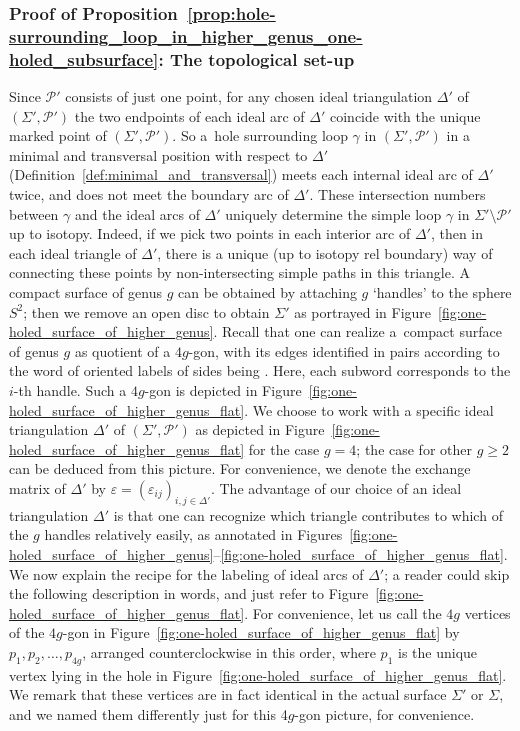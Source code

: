 \documentclass[10pt,a4paper]{amsart}
\numberwithin{equation}{section}
\theoremstyle{definition}
\begin{document}
\subsubsection{Proof of Proposition~\ref{prop:hole-surrounding_loop_in_higher_genus_one-holed_subsurface}: The topological set-up}
Since $\mathcal{P}'$ consists of just one point, for any chosen ideal triangulation $\Delta'$ of $(\Sigma',\mathcal{P}')$ the two endpoints of each ideal arc of $\Delta'$ coincide with the unique marked point of $(\Sigma',\mathcal{P}')$. So a~hole surrounding loop $\gamma$ in $(\Sigma',\mathcal{P}')$ in a minimal and transversal position with respect to $\Delta'$ (Definition~\ref{def:minimal_and_transversal}) meets each internal ideal arc of $\Delta'$ twice, and does not meet the boundary arc of $\Delta'$. These intersection numbers between $\gamma$ and the ideal arcs of $\Delta'$ uniquely determine the simple loop $\gamma$ in $\Sigma'\setminus\mathcal{P}'$ up to isotopy. Indeed, if we pick two points in each interior arc of $\Delta'$, then in each ideal triangle of $\Delta'$, there is a unique (up to isotopy rel boundary) way of connecting these points by non-intersecting simple paths in this triangle.
A compact surface of genus $g$ can be obtained by attaching $g$ `handles' to the sphere $S^2$; then we remove an open disc to obtain $\Sigma'$ as portrayed in Figure~\ref{fig:one-holed_surface_of_higher_genus}. Recall that one can realize a~compact surface of genus $g$ as quotient of a $4g$-gon, with its edges identified in pairs according to the word of oriented labels of sides being . Here, each subword  corresponds to the $i$-th handle. Such a $4g$-gon is depicted in Figure~\ref{fig:one-holed_surface_of_higher_genus_flat}.
We choose to work with a specific ideal triangulation $\Delta'$ of $(\Sigma',\mathcal{P}')$ as depicted in Figure~\ref{fig:one-holed_surface_of_higher_genus_flat} for the case $g=4$; the case for other $g\ge 2$ can be deduced from this picture. For convenience, we denote the exchange matrix of $\Delta'$ by $\varepsilon = (\varepsilon_{ij})_{i,j\in \Delta'}$. The advantage of our choice of an ideal triangulation $\Delta'$ is that one can recognize which triangle contributes to which of the $g$ handles relatively easily, as annotated in Figures~\ref{fig:one-holed_surface_of_higher_genus}--\ref{fig:one-holed_surface_of_higher_genus_flat}. We now explain the recipe for the labeling of ideal arcs of $\Delta'$; a reader could skip the following description in words, and just refer to Figure~\ref{fig:one-holed_surface_of_higher_genus_flat}. For convenience, let us call the $4g$ vertices of the $4g$-gon in Figure~\ref{fig:one-holed_surface_of_higher_genus_flat} by $p_1,p_2,\dots,p_{4g}$, arranged counterclockwise in this order, where $p_1$ is the unique vertex lying in the hole in Figure~\ref{fig:one-holed_surface_of_higher_genus_flat}. We remark that these vertices are in fact identical in the actual surface $\Sigma'$ or $\Sigma$, and we named them differently just for this 4$g$-gon picture, for convenience.
\end{document}
